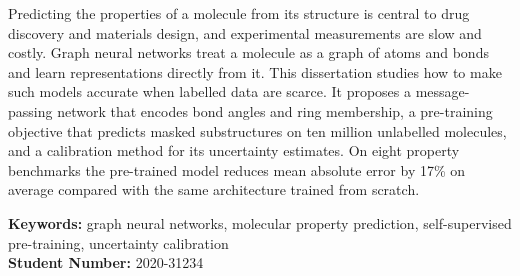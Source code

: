 Predicting the properties of a molecule from its structure is central to drug discovery and
materials design, and experimental measurements are slow and costly. Graph neural networks treat
a molecule as a graph of atoms and bonds and learn representations directly from it. This
dissertation studies how to make such models accurate when labelled data are scarce. It proposes
a message-passing network that encodes bond angles and ring membership, a pre-training objective
that predicts masked substructures on ten million unlabelled molecules, and a calibration method
for its uncertainty estimates. On eight property benchmarks the pre-trained model reduces mean
absolute error by 17\% on average compared with the same architecture trained from scratch.

\medskip\noindent\textbf{Keywords:} graph neural networks, molecular property prediction,
self-supervised pre-training, uncertainty calibration\\
\textbf{Student Number:} 2020-31234

